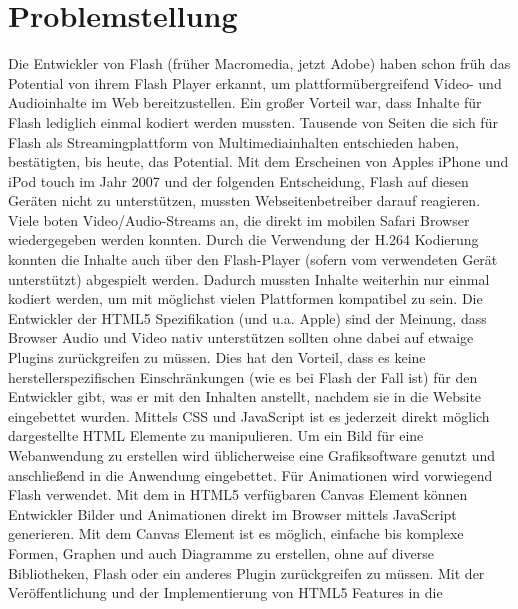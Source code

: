 \section{Problemstellung}
Die Entwickler von Flash (früher Macromedia, jetzt Adobe) haben schon früh das
Potential von ihrem Flash Player erkannt, um plattformübergreifend Video- und
Audioinhalte im Web bereitzustellen. Ein großer Vorteil war, dass Inhalte für
Flash lediglich einmal kodiert werden mussten. Tausende von Seiten die sich für
Flash als Streamingplattform von Multimediainhalten entschieden haben,
bestätigten, bis heute, das Potential.
\newline\newline
Mit dem Erscheinen von Apples iPhone und iPod touch im Jahr 2007 und der
folgenden Entscheidung, Flash auf diesen Geräten nicht zu unterstützen, mussten
Webseitenbetreiber darauf reagieren. Viele boten Video/Audio-Streams an, die
direkt im mobilen Safari Browser wiedergegeben werden konnten. Durch die
Verwendung der H.264 Kodierung konnten die Inhalte auch über den Flash-Player
(sofern vom verwendeten Gerät unterstützt) abgespielt werden. Dadurch mussten
Inhalte weiterhin nur einmal kodiert werden, um mit möglichst vielen
Plattformen kompatibel zu sein.
\newline\newline
Die Entwickler der HTML5 Spezifikation (und u.a. Apple) sind der Meinung, dass
Browser Audio und Video nativ unterstützen sollten ohne dabei auf etwaige
Plugins zurückgreifen zu müssen. Dies hat den Vorteil, dass es keine
herstellerspezifischen Einschränkungen (wie es bei Flash der Fall ist) für den
Entwickler gibt, was er mit den Inhalten anstellt, nachdem sie in die Website
eingebettet wurden. Mittels CSS und JavaScript ist es jederzeit direkt möglich
dargestellte HTML Elemente zu manipulieren.
\newline\newline
Um ein Bild für eine Webanwendung zu erstellen wird üblicherweise eine
Grafiksoftware genutzt und anschließend in die Anwendung eingebettet. Für
Animationen wird vorwiegend Flash verwendet. Mit dem in HTML5 verfügbaren
Canvas Element können Entwickler Bilder und Animationen direkt im Browser
mittels JavaScript generieren. Mit dem Canvas Element ist es möglich, einfache
bis komplexe Formen, Graphen und auch Diagramme zu erstellen, ohne auf diverse
Bibliotheken, Flash oder ein anderes Plugin zurückgreifen zu müssen.
\newline\newline
Mit der Veröffentlichung und der Implementierung von HTML5 Features in die
